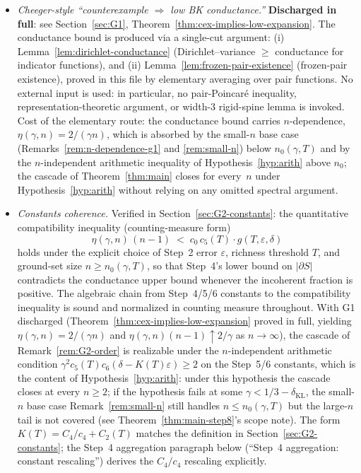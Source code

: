 \begin{itemize}[leftmargin=*]
 \item[\textbf{G1}] \emph{Cheeger-style ``counterexample $\Rightarrow$ low
 BK conductance.''} \textbf{Discharged in full}: see
 Section~\ref{sec:G1}, Theorem~\ref{thm:cex-implies-low-expansion}.
 The conductance bound is produced via a single-cut argument: (i)
 Lemma~\ref{lem:dirichlet-conductance} (Dirichlet--variance $\ge$
 conductance for indicator functions), and (ii)
 Lemma~\ref{lem:frozen-pair-existence} (frozen-pair existence),
 proved in this file by elementary averaging over pair functions.
 No external input is used: in particular, no pair-Poincar\'e
 inequality, representation-theoretic argument, or width-$3$
 rigid-spine lemma is invoked.
 Cost of the elementary route: the conductance bound carries
 $n$-dependence, $\eta(\gamma, n) = 2/(\gamma n)$, which is absorbed
 by the small-$n$ base case (Remarks~\ref{rem:n-dependence-g1} and
 \ref{rem:small-n}) below $n_0(\gamma, T)$ and by the
 $n$-independent arithmetic inequality of
 Hypothesis~\ref{hyp:arith} above $n_0$; the cascade of
 Theorem~\ref{thm:main} closes for every~$n$ under
 Hypothesis~\ref{hyp:arith} without relying on any omitted spectral
 argument.

 \item[\textbf{G2}] \emph{Constants coherence.} Verified in
 Section~\ref{sec:G2-constants}: the quantitative compatibility
 inequality (counting-measure form)
 \[
   \eta(\gamma, n)\,(n-1) \;<\; c_0\, c_5(T) \cdot g(T, \varepsilon, \delta)
 \]
 holds under the explicit choice of Step~2 error $\varepsilon$,
 richness threshold $T$, and ground-set size
 $n \ge n_0(\gamma, T)$, so that Step~4's lower bound on $|\partial
 S|$ contradicts the conductance upper bound whenever the incoherent
 fraction is positive.
 The algebraic chain from
 Step~4/5/6 constants to the compatibility inequality is sound and
 normalized in counting measure throughout. With G1 discharged
 (Theorem~\ref{thm:cex-implies-low-expansion} proved in full,
 yielding $\eta(\gamma, n) = 2/(\gamma n)$ and
 $\eta(\gamma,n)(n-1) \uparrow 2/\gamma$ as $n \to \infty$), the
 cascade of Remark~\ref{rem:G2-order} is realizable under the
 $n$-independent arithmetic condition
 $\gamma^2 c_5(T) c_6 (\delta - K(T)\varepsilon) \ge 2$ on the
 Step~5/6 constants, which is the content of
 Hypothesis~\ref{hyp:arith}: under this hypothesis the cascade
 closes at every $n \ge 2$; if the hypothesis fails at some
 $\gamma < 1/3 - \delta_{\mathrm{KL}}$, the small-$n$ base case
 Remark~\ref{rem:small-n} still handles $n \le n_0(\gamma, T)$
 but the large-$n$ tail is not covered (see
 Theorem~\ref{thm:main-step8}'s scope note).
 The form $K(T) = C_4/c_4 + C_2(T)$
 matches the definition in Section~\ref{sec:G2-constants}; the Step~4
 aggregation paragraph below (``Step~4 aggregation: constant
 rescaling'') derives the $C_4/c_4$ rescaling explicitly.


\end{itemize}
